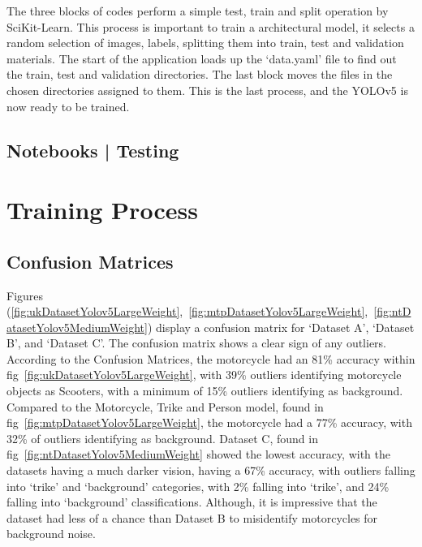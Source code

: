 \documentclass[12pt]{report} %
\begin{document}
			The three blocks of codes perform a simple test, train and split operation by SciKit-Learn. This process is important to train a architectural model, it selects a random selection of images, labels, splitting them into train, test and validation materials. The start of the application loads up the `data.yaml' file to find out the train, test and validation directories. The last block moves the files in the chosen directories assigned to them. This is the last process, and the YOLOv5 is now ready to be trained. 

	\section{Notebooks | Testing}

\chapter{Training Process}
\label{chap:trainingProcess}
	\section{Confusion Matrices}
		Figures (\ref{fig:ukDatasetYolov5LargeWeight},~\ref{fig:mtpDatasetYolov5LargeWeight},~\ref{fig:ntDatasetYolov5MediumWeight}) display a confusion matrix for `Dataset A', `Dataset B', and `Dataset C'. The confusion matrix shows a clear sign of any outliers. According to the Confusion Matrices, the motorcycle had an 81\% accuracy within fig~\ref{fig:ukDatasetYolov5LargeWeight}, with 39\% outliers identifying motorcycle objects as Scooters, with a minimum of 15\% outliers identifying as background. Compared to the Motorcycle, Trike and Person model, found in fig~\ref{fig:mtpDatasetYolov5LargeWeight}, the motorcycle had a 77\% accuracy, with 32\% of outliers identifying as background. Dataset C, found in fig~\ref{fig:ntDatasetYolov5MediumWeight} showed the lowest accuracy, with the datasets having a much darker vision, having a 67\% accuracy, with outliers falling into `trike' and `background' categories, with 2\% falling into `trike', and 24\% falling into `background' classifications. Although, it is impressive that the dataset had less of a chance than Dataset B to misidentify motorcycles for background noise.
\end{document}
